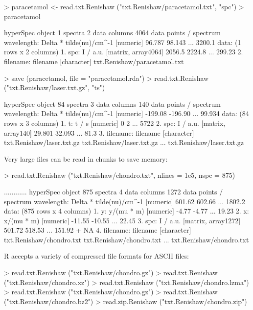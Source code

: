 \documentclass[english, a4paper, 10pt, headings=small, DIV11]{scrartcl}
\renewenvironment{Schunk}{\vspace{0pt}\begin{small}}{\end{small}\vspace{0pt}}
\begin{document}
\begin{Schunk}
\begin{Sinput}
> paracetamol <- read.txt.Renishaw ("txt.Renishaw/paracetamol.txt", "spc")
> paracetamol
\end{Sinput}
\begin{Soutput}
hyperSpec object
   1 spectra
   2 data columns
   4064 data points / spectrum
wavelength: Delta * tilde(nu)/cm^-1 [numeric] 96.787 98.143 ... 3200.1 
data:  (1 rows x 2 columns)
   1. spc: I / a.u. [matrix, array4064] 2056.5 2224.8 ... 299.23 
   2. filename: filename [character] txt.Renishaw/paracetamol.txt 
\end{Soutput}
\begin{Sinput}
> save (paracetamol, file = "paracetamol.rda")
> read.txt.Renishaw ("txt.Renishaw/laser.txt.gz", "ts")
\end{Sinput}
\begin{Soutput}
hyperSpec object
   84 spectra
   3 data columns
   140 data points / spectrum
wavelength: Delta * tilde(nu)/cm^-1 [numeric] -199.08 -196.90 ... 99.934 
data:  (84 rows x 3 columns)
   1. t: t / s [numeric] 0 2 ... 5722 
   2. spc: I / a.u. [matrix, array140] 29.801 32.093 ... 81.3 
   3. filename: filename [character] txt.Renishaw/laser.txt.gz txt.Renishaw/laser.txt.gz ... txt.Renishaw/laser.txt.gz 
\end{Soutput}
\end{Schunk}

Very large files can  be read in chunks to save  memory:
\begin{Schunk}
\begin{Sinput}
> read.txt.Renishaw ("txt.Renishaw/chondro.txt", nlines = 1e5, nspc = 875)
\end{Sinput}
\begin{Soutput}
............
hyperSpec object
   875 spectra
   4 data columns
   1272 data points / spectrum
wavelength: Delta * tilde(nu)/cm^-1 [numeric] 601.62 602.66 ... 1802.2 
data:  (875 rows x 4 columns)
   1. y: y/(mu * m) [numeric] -4.77 -4.77 ... 19.23 
   2. x: x/(mu * m) [numeric] -11.55 -10.55 ... 22.45 
   3. spc: I / a.u. [matrix, array1272] 501.72 518.53 ... 151.92 + NA
   4. filename: filename [character] txt.Renishaw/chondro.txt txt.Renishaw/chondro.txt ... txt.Renishaw/chondro.txt 
\end{Soutput}
\end{Schunk}

R accepts a variety of compressed file formats for ASCII files:
\begin{Schunk}
\begin{Sinput}
> read.txt.Renishaw ("txt.Renishaw/chondro.gz")
> read.txt.Renishaw ("txt.Renishaw/chondro.xz")
> read.txt.Renishaw ("txt.Renishaw/chondro.lzma")
> read.txt.Renishaw ("txt.Renishaw/chondro.gz")
> read.txt.Renishaw ("txt.Renishaw/chondro.bz2")
> read.zip.Renishaw ("txt.Renishaw/chondro.zip")
\end{Sinput}
\end{Schunk}
\end{document}

